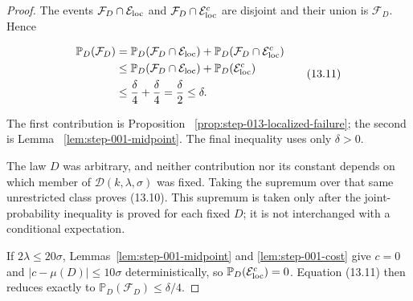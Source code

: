 \begin{proof}
The events
\(\mathcal F_D\cap\mathcal E_{\rm loc}\) and
\(\mathcal F_D\cap\mathcal E_{\rm loc}^c\) are disjoint and their union is
\(\mathcal F_D\). Hence

\[
\begin{aligned}
\mathbb P_D(\mathcal F_D)
&=\mathbb P_D(\mathcal F_D\cap\mathcal E_{\rm loc})
 +\mathbb P_D(\mathcal F_D\cap\mathcal E_{\rm loc}^c)\\
&\leq\mathbb P_D(\mathcal F_D\cap\mathcal E_{\rm loc})
 +\mathbb P_D(\mathcal E_{\rm loc}^c)\\
&\leq\frac\delta4+\frac\delta4
=\frac\delta2
\leq\delta.
\end{aligned}
\tag{13.11}
\]

The first contribution is Proposition~
\ref{prop:step-013-localized-failure}; the second is Lemma~
\ref{lem:step-001-midpoint}. The final inequality uses only
\(\delta>0\).

The law \(D\) was arbitrary, and neither contribution nor its constant
depends on which member of \(\mathcal D(k,\lambda,\sigma)\) was fixed.
Taking the supremum over that same unrestricted class proves (13.10). This
supremum is taken only after the joint-probability inequality is proved for
each fixed \(D\); it is not interchanged with a conditional expectation.

If \(2\lambda\leq20\sigma\), Lemmas~\ref{lem:step-001-midpoint} and
\ref{lem:step-001-cost} give
\(c=0\) and \(|c-\mu(D)|\leq10\sigma\) deterministically, so
\(\mathbb P_D(\mathcal E_{\rm loc}^c)=0\). Equation (13.11) then reduces
exactly to \(\mathbb P_D(\mathcal F_D)\leq\delta/4\).
\end{proof}

